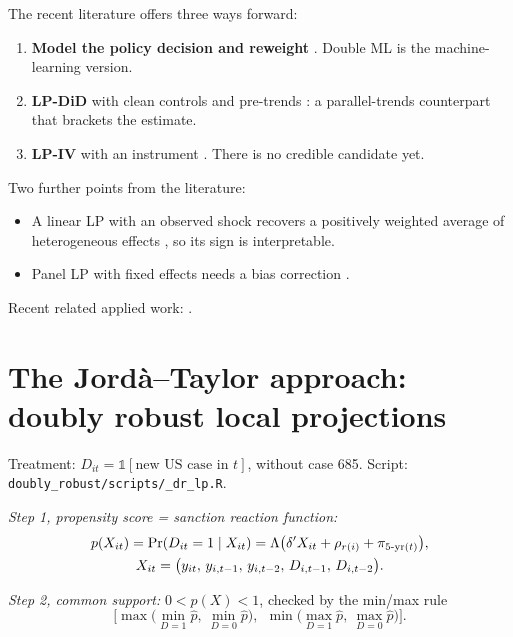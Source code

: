 \documentclass[11pt,a4paper]{article}
\begin{document}
The recent literature offers three ways forward:
\begin{enumerate}[leftmargin=*]
\item \textbf{Model the policy decision and reweight} \citep{angrist2018,jordataylor2016}. Double ML
  \citep{chernozhukov2018} is the machine-learning version.
\item \textbf{LP-DiD} with clean controls and pre-trends \citep{dube2025}: a parallel-trends counterpart that brackets
  the estimate.
\item \textbf{LP-IV} with an instrument \citep{stock2018}. There is no credible candidate yet.
\end{enumerate}
Two further points from the literature:
\begin{itemize}[leftmargin=*]
\item A linear LP with an observed shock recovers a positively weighted average of heterogeneous effects
  \citep{kolesar2025}, so its sign is interpretable.
\item Panel LP with fixed effects needs a bias correction \citep{herbst2024,mei2026}.
\end{itemize}
Recent related applied work: \citet{farzanegan2026}.

\section{The Jordà--Taylor approach: doubly robust local projections}
\label{sec:jt}

Treatment: $D_{it} = \mathds{1}[\text{new US case in } t]$, without case 685. Script:
\texttt{doubly\_robust/scripts/\_dr\_lp.R}.

\textit{Step 1, propensity score = sanction reaction function:}
\begin{gather}
  p(X_{it}) = \Pr(D_{it}=1 \mid X_{it}) = \Lambda\big(\delta' X_{it} + \rho_{r(i)} + \pi_{\text{5-yr}(t)}\big), \\
  X_{it} = \big(y_{it},\, y_{i,t-1},\, y_{i,t-2},\, D_{i,t-1},\, D_{i,t-2}\big). \notag
\end{gather}

\textit{Step 2, common support:} $0<p(X)<1$, checked by the min/max rule \citep{crump2009}
\[
  \Big[\max\big(\min_{D=1}\hat p,\ \min_{D=0}\hat p\big),\ \ \min\big(\max_{D=1}\hat p,\ \max_{D=0}\hat p\big)\Big].
\]
\end{document}
